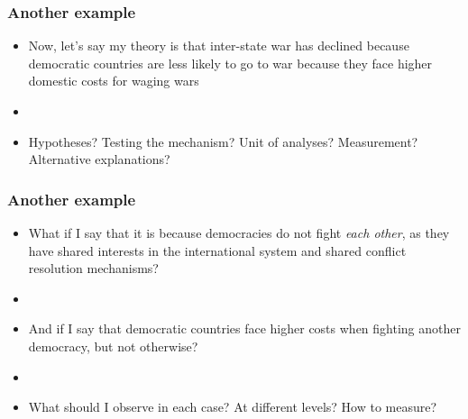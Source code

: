 \documentclass[aspectratio=43]{beamer}
\begin{document}
\begin{frame}
\frametitle{Another example}
\centering

\begin{itemize}
  \item Now, let's say my theory is that inter-state war has declined because democratic countries are less likely to go to war because they face higher domestic costs for waging wars
  \item[]
  \item Hypotheses? Testing the mechanism? Unit of analyses? Measurement? Alternative explanations?
\end{itemize}

\end{frame}

\begin{frame}
\frametitle{Another example}
\centering

\begin{itemize}
  \item What if I say that it is because democracies do not fight \textit{each other}, as they have shared interests in the international system and shared conflict resolution mechanisms?
  \item[]
  \item And if I say that democratic countries face higher costs when fighting another democracy, but not otherwise?
  \item[]
  \item What should I observe in each case? At different levels? How to measure?
\end{itemize}

\end{frame}
\end{document}
